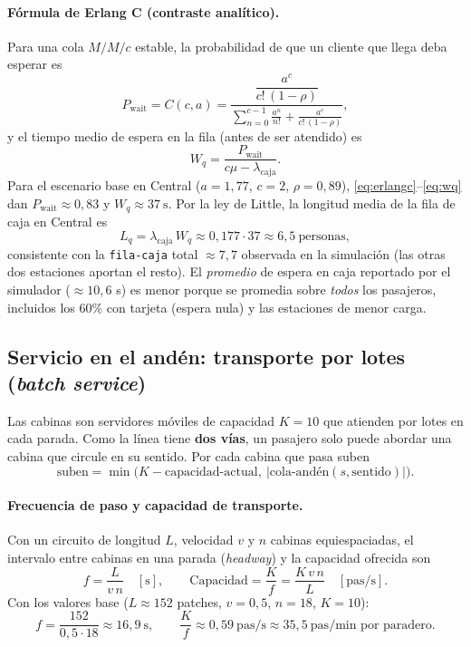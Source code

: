 \documentclass[11pt,a4paper]{article}
\newcommand{\code}[1]{\texttt{#1}}
\begin{document}
\paragraph{Fórmula de Erlang C (contraste analítico).} Para una cola $M/M/c$
estable, la probabilidad de que un cliente que llega deba esperar es
\begin{equation}
P_{\text{wait}} = C(c,a) =
\frac{\dfrac{a^{c}}{c!\,(1-\rho)}}
{\displaystyle\sum_{n=0}^{c-1}\frac{a^{n}}{n!} + \frac{a^{c}}{c!\,(1-\rho)}},
\label{eq:erlangc}
\end{equation}
y el tiempo medio de espera en la fila (antes de ser atendido) es
\begin{equation}
W_q = \frac{P_{\text{wait}}}{c\mu - \lambda_{\text{caja}}}.
\label{eq:wq}
\end{equation}
Para el escenario base en Central ($a=1{,}77$, $c=2$, $\rho=0{,}89$),
\eqref{eq:erlangc}--\eqref{eq:wq} dan $P_{\text{wait}}\approx 0{,}83$ y
$W_q\approx 37\ \text{s}$. Por la ley de Little, la longitud media de la fila de caja
en Central es
\begin{equation}
L_q = \lambda_{\text{caja}}\, W_q \approx 0{,}177 \cdot 37 \approx 6{,}5\ \text{personas},
\end{equation}
consistente con la \code{fila-caja} total $\approx 7{,}7$ observada en la simulación
(las otras dos estaciones aportan el resto). El \emph{promedio} de espera en caja
reportado por el simulador ($\approx 10{,}6$ s) es menor porque se promedia sobre
\emph{todos} los pasajeros, incluidos los $60\%$ con tarjeta (espera nula) y las
estaciones de menor carga.

\subsection{Servicio en el andén: transporte por lotes (\emph{batch service})}
Las cabinas son servidores móviles de capacidad $K=10$ que atienden por lotes en
cada parada. Como la línea tiene \textbf{dos vías}, un pasajero solo puede abordar
una cabina que circule en su sentido. Por cada cabina que pasa suben
\begin{equation}
\text{suben} = \min\!\bigl(K - \text{capacidad-actual},\ |\text{cola-andén}(s,\text{sentido})|\bigr).
\end{equation}

\paragraph{Frecuencia de paso y capacidad de transporte.} Con un circuito de
longitud $L$, velocidad $v$ y $n$ cabinas equiespaciadas, el intervalo entre cabinas
en una parada (\emph{headway}) y la capacidad ofrecida son
\begin{equation}
f = \frac{L}{v\,n}\quad[\text{s}],\qquad
\text{Capacidad} = \frac{K}{f} = \frac{K\,v\,n}{L}\quad[\text{pas/s}].
\end{equation}
Con los valores base ($L \approx 152$ patches, $v=0{,}5$, $n=18$, $K=10$):
\begin{equation}
f = \frac{152}{0{,}5\cdot 18} \approx 16{,}9\ \text{s},\qquad
\frac{K}{f} \approx 0{,}59\ \text{pas/s} \approx 35{,}5\ \text{pas/min por paradero}.
\end{equation}
\end{document}
